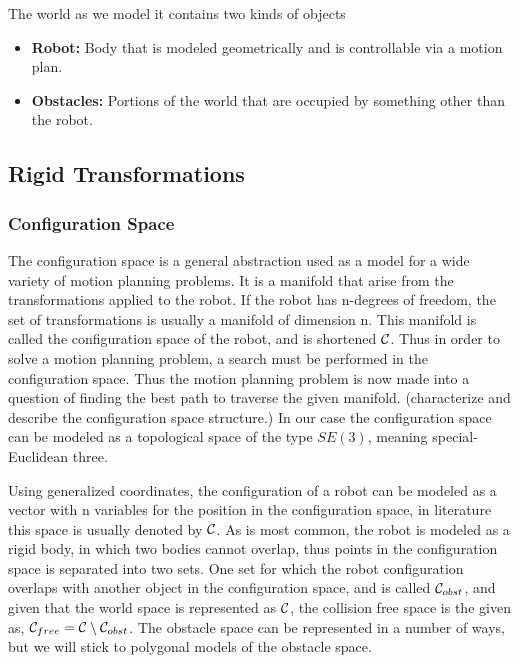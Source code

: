The world as we model it contains two kinds of objects

\begin{itemize}
\item \textbf{Robot:} Body that is modeled geometrically and is controllable via
  a motion plan.
\item \textbf{Obstacles:} Portions of the world that are occupied by something
  other than the robot.
\end{itemize}

\subsection{Rigid Transformations}


\subsubsection{Configuration Space}
The configuration space is a general abstraction used as a model for a wide
variety of motion planning problems. It is a manifold that arise from the
transformations applied to the robot. If the robot has n-degrees of freedom, the
set of transformations is usually a manifold of dimension n. This manifold is
called the configuration space of the robot, and is shortened
\(\mathcal{C}{}\). Thus in order to solve a motion planning
problem, a search must be performed in the configuration space. Thus the motion
planning problem is now made into a question of finding the best path to
traverse the given manifold\cite{Lav06}. (characterize and describe the
configuration space structure.) In our case the configuration space can be
modeled as a topological space of the type \(SE(3)\), meaning special-Euclidean
three.

Using generalized coordinates, the configuration of a robot can be modeled as a
vector with n variables for the position in the configuration space, in
literature this space is usually denoted by \(\mathcal{C}{}\). As
is most common, the robot is modeled as a rigid body, in which two bodies cannot
overlap, thus points in the configuration space is separated into two sets. One
set for which the robot configuration overlaps with another object in the
configuration space, and is called \(\mathcal{C}_{obst}{}\), and given
that the world space is represented as \(\mathcal{C}{}\), the
collision free space is the given as, \(\mathcal{C}_{free} =
\mathcal{C} \setminus \mathcal{C}_{obst}\). The obstacle
space can be represented in a number of ways, but we will stick to polygonal
models of the obstacle space.

